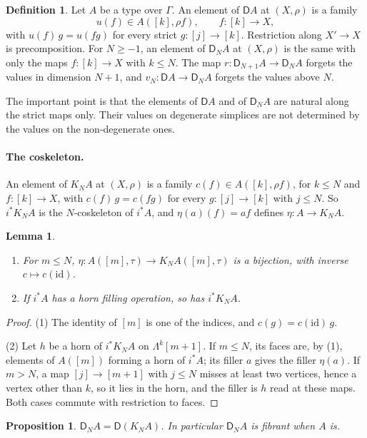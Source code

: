 \documentclass[11pt]{article}
\newcommand{\id}{\mathrm{id}}
\newcommand{\D}{\mathsf{D}}
\newcommand{\Lam}{\Lambda}
\theoremstyle{plain}
\newtheorem{lemma}[theorem]{Lemma}
\newtheorem{proposition}[theorem]{Proposition}
\theoremstyle{definition}
\newtheorem{definition}[theorem]{Definition}
\theoremstyle{remark}
\begin{document}
\begin{definition}
Let $A$ be a type over $\Gamma$. An element of $\D A$ at $(X,\rho)$ is a
family
\[
u(f)\in A([k],\rho f),\qquad f:[k]\to X,
\]
with $u(f)\,g=u(fg)$ for every strict $g:[j]\to[k]$. Restriction along
$X'\to X$ is precomposition. For $N\ge-1$, an element of $\D_NA$ at
$(X,\rho)$ is the same with only the maps $f:[k]\to X$ with $k\le N$. The
map $r:\D_{N+1}A\to\D_NA$ forgets the values in dimension $N+1$, and
$v_N:\D A\to\D_NA$ forgets the values above $N$.
\end{definition}

The important point is that the elements of $\D A$ and of $\D_NA$ are
natural along the strict maps only. Their values on degenerate simplices
are not determined by the values on the non-degenerate ones.

\paragraph{The coskeleton.} An element of $K_NA$ at $(X,\rho)$ is a
family $c(f)\in A([k],\rho f)$, for $k\le N$ and $f:[k]\to X$, with
$c(f)\,g=c(fg)$ for every $g:[j]\to[k]$ with $j\le N$. So $i^*K_NA$ is the
$N$-coskeleton of $i^*A$, and $\eta(a)(f)=af$ defines $\eta:A\to K_NA$.

\begin{lemma}\label{lem:cosk}
\leavevmode
\begin{enumerate}
\item For $m\le N$, $\eta:A([m],\tau)\to K_NA([m],\tau)$ is a bijection,
  with inverse $c\mapsto c(\id)$.
\item If $i^*A$ has a horn filling operation, so has $i^*K_NA$.
\end{enumerate}
\end{lemma}

\begin{proof}
(1) The identity of $[m]$ is one of the indices, and $c(g)=c(\id)\,g$.

(2) Let $h$ be a horn of $i^*K_NA$ on $\Lam^k[m+1]$. If $m\le N$, its faces
are, by (1), elements of $A([m])$ forming a horn of $i^*A$; its filler $a$
gives the filler $\eta(a)$. If $m>N$, a map $[j]\to[m+1]$ with $j\le N$
misses at least two vertices, hence a vertex other than $k$, so it lies in
the horn, and the filler is $h$ read at these maps. Both cases commute with
restriction to faces.
\end{proof}

\begin{proposition}\label{prop:DN}
$\D_NA=\D(K_NA)$. In particular $\D_NA$ is fibrant when $A$ is.
\end{proposition}
\end{document}
